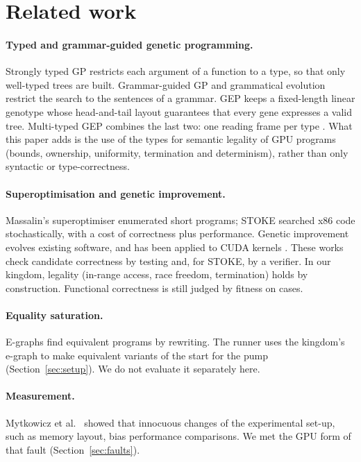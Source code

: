 \documentclass[sigconf,nonacm]{acmart}
\begin{document}
\section{Related work}

\paragraph{Typed and grammar-guided genetic programming.} Strongly typed GP
\cite{montana1995stgp} restricts each argument of a function to a type, so
that only well-typed trees are built. Grammar-guided GP \cite{whigham1995grammar}
and grammatical evolution \cite{oneill2001ge} restrict the search to the
sentences of a grammar. GEP \cite{ferreira2001gep} keeps a fixed-length linear
genotype whose head-and-tail layout guarantees that every gene expresses a
valid tree. Multi-typed GEP combines the last two: one reading frame per type
\cite{morgan_core}. What this paper adds is the use of the types for semantic
legality of GPU programs (bounds, ownership, uniformity, termination and
determinism), rather than only syntactic or type-correctness.

\paragraph{Superoptimisation and genetic improvement.} Massalin's
superoptimiser \cite{massalin1987superopt} enumerated short programs; STOKE
\cite{schkufza2013stoke} searched x86 code stochastically, with a cost of
correctness plus performance. Genetic improvement \cite{petke2018gi} evolves
existing software, and has been applied to CUDA kernels
\cite{langdon2014cuda,langdon2017gpu}. These works check candidate correctness
by testing and, for STOKE, by a verifier. In our kingdom, legality (in-range
access, race freedom, termination) holds by construction. Functional
correctness is still judged by fitness on cases.

\paragraph{Equality saturation.} E-graphs \cite{tate2009equality,willsey2021egg}
find equivalent programs by rewriting. The runner uses the kingdom's e-graph
to make equivalent variants of the start for the pump
(Section~\ref{sec:setup}). We do not evaluate it separately here.

\paragraph{Measurement.} Mytkowicz et al.\ \cite{mytkowicz2009wrong} showed that
innocuous changes of the experimental set-up, such as memory layout, bias
performance comparisons. We met the GPU form of that fault
(Section~\ref{sec:faults}).
\end{document}
